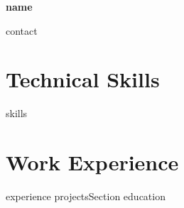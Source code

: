 \documentclass[10pt, a4paper]{article}
\begin{document}
\begin{center}
{\Large\bfseries\color{primary} {{{name}}}}\par\vspace{2pt}
{\small\color{subtle} {{{contact}}}}
\end{center}
\vspace{-1pt}
\section{Technical Skills}
\vspace{1pt}
{{{skills}}}
\vspace{1pt}
\section{Work Experience}
\vspace{1pt}
{{{experience}}}
{{{projectsSection}}}
{{{education}}}
\end{document}
